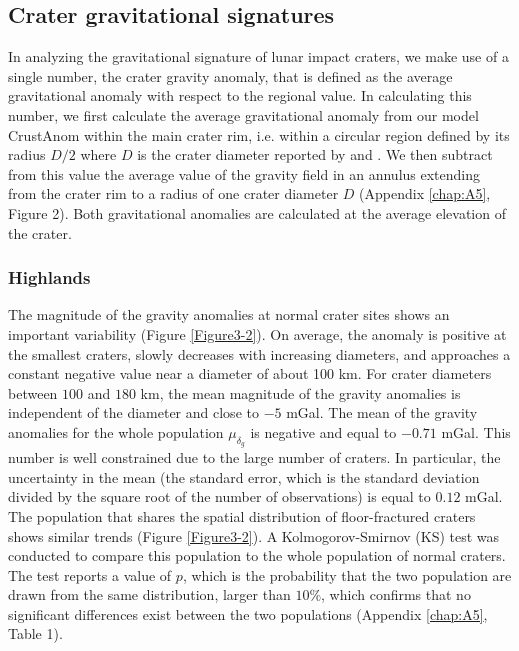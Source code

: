 \subsection{Crater gravitational signatures}
\label{sec:crat-grav-sign}
  
In analyzing the  gravitational signature of lunar  impact craters, we
make  use of  a single  number, the  crater gravity  anomaly, that  is
defined  as the  average  gravitational anomaly  with  respect to  the
regional value.   In calculating this  number, we first  calculate the
average gravitational anomaly from our model CrustAnom within the main
crater rim, i.e.  within a circular region defined by its radius $D/2$
where $D$ is  the crater diameter reported  by \citet{Head:2010fy} and
\citet{Jozwiak:2012dq}.  We then subtract  from this value the average
value of the gravity field in an annulus extending from the crater rim
to a radius of one crater diameter $D$ (Appendix \ref{chap:A5}, Figure
2).   Both  gravitational  anomalies  are calculated  at  the  average
elevation of the crater.

\subsubsection{Highlands}
\label{sec:highlands-1}
  
The magnitude of the gravity anomalies at normal crater sites shows an
important  variability  (Figure  \ref{Figure3-2}).   On  average,  the
anomaly is  positive at  the smallest  craters, slowly  decreases with
increasing diameters, and approaches a  constant negative value near a
diameter  of about  100 km.   For crater  diameters between  $100$ and
$180$ km, the  mean magnitude of the gravity  anomalies is independent
of  the diameter  and close  to $-5$  mGal.  The  mean of  the gravity
anomalies for  the whole  population $\mu_{\delta_g}$ is  negative and
equal to  $-0.71$ mGal.  This  number is  well constrained due  to the
large number of  craters.  In particular, the uncertainty  in the mean
(the standard  error, which is  the standard deviation divided  by the
square root of  the number of observations) is equal  to $ 0.12$ mGal.
The population that shares the spatial distribution of floor-fractured
craters   shows   similar    trends   (Figure   \ref{Figure3-2}).    A
Kolmogorov-Smirnov (KS) test was  conducted to compare this population
to the whole  population of normal craters.  The test  reports a value
of $p$,  which is the  probability that  the two population  are drawn
from the same distribution, larger than $10\%$, which confirms that no
significant differences  exist between  the two  populations (Appendix
\ref{chap:A5}, Table 1).
  
